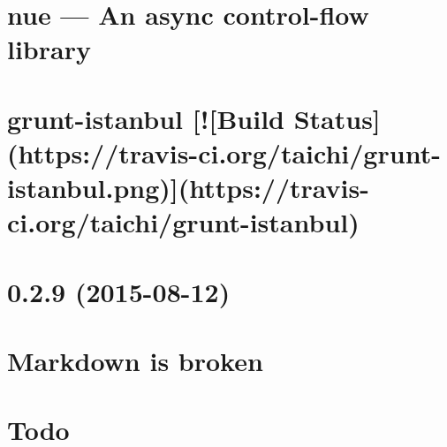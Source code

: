 \documentclass[twoside]{book}
\newcommand{\+}{\discretionary{\mbox{\scriptsize$\hookleftarrow$}}{}{}}
\begin{document}
\chapter{nue — An async control-\/flow library}
\label{md__c_1__users_martin__documents__git_hub_visual_studio__bachelor__wis_r__wis_r_node_modules_grud8c41316776572c617be9f6f35daa688}
\hypertarget{md__c_1__users_martin__documents__git_hub_visual_studio__bachelor__wis_r__wis_r_node_modules_grud8c41316776572c617be9f6f35daa688}{}

\chapter{grunt-\/istanbul \mbox{[}!\mbox{[}Build Status\mbox{]}(https\+://travis-\/ci.org/taichi/grunt-\/istanbul.png)\mbox{]}(https\+://travis-\/ci.org/taichi/grunt-\/istanbul)}
\label{md__c_1__users_martin__documents__git_hub_visual_studio__bachelor__wis_r__wis_r_node_modules_grunt-istanbul__r_e_a_d_m_e}
\hypertarget{md__c_1__users_martin__documents__git_hub_visual_studio__bachelor__wis_r__wis_r_node_modules_grunt-istanbul__r_e_a_d_m_e}{}

\chapter{0.2.9 (2015-\/08-\/12)}
\label{md__c_1__users_martin__documents__git_hub_visual_studio__bachelor__wis_r__wis_r_node_modules_grunt-ngdocs__c_h_a_n_g_e_l_o_g}
\hypertarget{md__c_1__users_martin__documents__git_hub_visual_studio__bachelor__wis_r__wis_r_node_modules_grunt-ngdocs__c_h_a_n_g_e_l_o_g}{}

\chapter{Markdown is broken}
\label{md__c_1__users_martin__documents__git_hub_visual_studio__bachelor__wis_r__wis_r_node_modules_gru05bbca06b354c68a35c334d176d23dfb}
\hypertarget{md__c_1__users_martin__documents__git_hub_visual_studio__bachelor__wis_r__wis_r_node_modules_gru05bbca06b354c68a35c334d176d23dfb}{}

\chapter{Todo}
\label{md__c_1__users_martin__documents__git_hub_visual_studio__bachelor__wis_r__wis_r_node_modules_grue5b60f66de688f1c885fa5fbb5490626}
\hypertarget{md__c_1__users_martin__documents__git_hub_visual_studio__bachelor__wis_r__wis_r_node_modules_grue5b60f66de688f1c885fa5fbb5490626}{}

\end{document}
